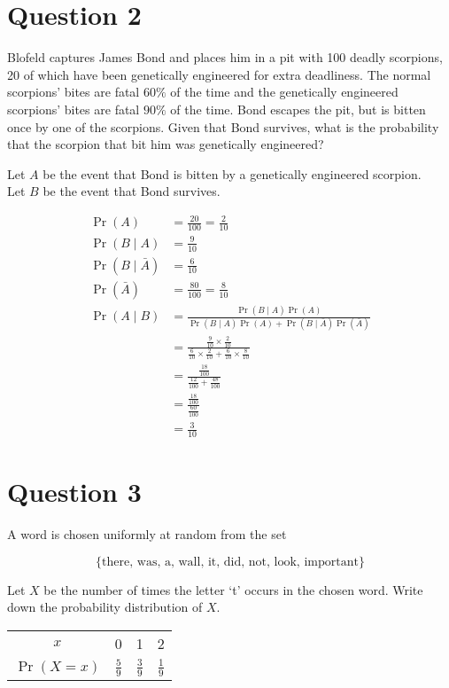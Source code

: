 \documentclass[11pt]{article}
\begin{document}
\break{}
\section*{Question 2}

Blofeld captures James Bond and places him in a pit with 100 deadly scorpions,
20 of which have been genetically engineered for extra deadliness. The normal
scorpions' bites are fatal $60\%$ of the time and the genetically engineered
scorpions' bites are fatal $90\%$ of the time. Bond escapes the pit, but is
bitten once by one of the scorpions. Given that Bond survives, what is the
probability that the scorpion that bit him was genetically engineered?

\bigskip
\noindent
Let $A$ be the event that Bond is bitten by a genetically engineered scorpion.
\\
Let $B$ be the event that Bond survives.

\begin{align*}
  \Pr(A) &= \frac{20}{100} = \frac{2}{10} \\
  \Pr(B \mid A) &= \frac{9}{10} \\
  \Pr(B \mid \bar A) &= \frac{6}{10} \\
  \Pr(\bar A) &= \frac{80}{100} = \frac{8}{10} \\
  \Pr(A \mid B) &= \frac{\Pr(B \mid A) \Pr(A)}{\Pr(B \mid A)\Pr(A) + \Pr(B \mid
  \bar A) \Pr(\bar A)} \\
  &= \frac{\frac{9}{10} \times \frac{2}{10}}{\frac{6}{10} \times \frac{2}{10} +
  \frac{6}{10} \times \frac{8}{10}} \\
  &= \frac{\frac{18}{100}}{\frac{12}{100}+\frac{48}{100}} \\
  &= \frac{\frac{18}{100}}{\frac{60}{100}} \\
  &= \frac{3}{10}
\end{align*}

\break{}
\section*{Question 3}

A word is chosen uniformly at random from the set

\[ \{ \text{there, was, a, wall, it, did, not, look, important} \}\]

\noindent
Let $X$ be the number of times the letter `t' occurs in the chosen word. Write
down the probability distribution of $X$.

\begin{center}
  \begin{tabular}{c c c c}
    \toprule
    $x$ & 0 & 1 & 2 \\
    $\Pr(X=x)$ & $\frac{5}{9}$ & $\frac{3}{9}$ & $\frac{1}{9}$ \\
    \bottomrule
  \end{tabular}
\end{center}
\end{document}
